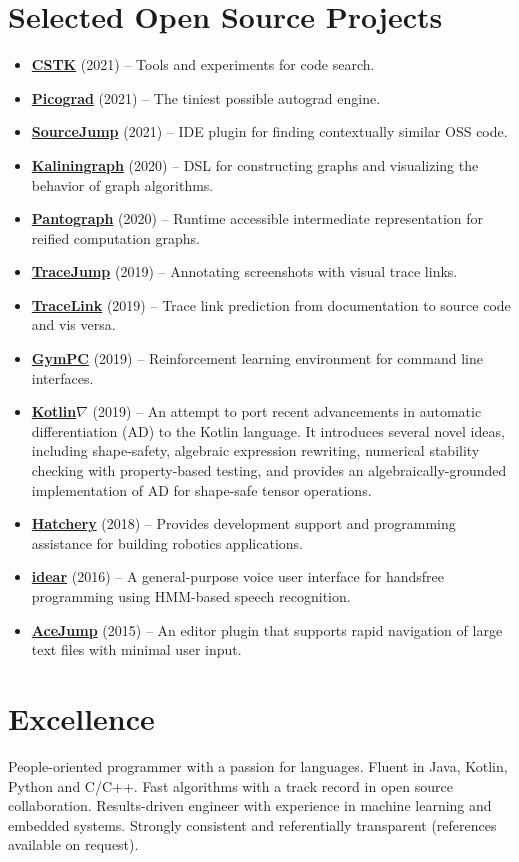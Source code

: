 \documentclass[letterpaper,11pt]{article}
\newcommand{\resumeItem}[2]{
  \item\small{\textbf{#1}{ #2 }}
}
\newcommand{\resumeSubItem}[2]{\resumeItem{#1}{#2}}
\newcommand{\resumeSubHeadingListStart}{\begin{itemize}[leftmargin=*]}
\newcommand{\resumeSubHeadingListEnd}{\end{itemize}}
\begin{document}
\begin{justify}
\section{Selected Open Source Projects}
\resumeSubHeadingListStart
\resumeSubItem{\href{https://github.com/breandan/CSTK}{CSTK}}{(2021) -- Tools and experiments for code search.}
\resumeSubItem{\href{https://github.com/breandan/picograd}{Picograd}}{(2021) -- The tiniest possible autograd engine.}
\resumeSubItem{\href{https://github.com/acejump/sourcejump}{SourceJump}}{(2021) -- IDE plugin for finding contextually similar OSS code.}
\resumeSubItem{\href{https://github.com/breandan/kaliningraph}{Kaliningraph}}{(2020) -- DSL for constructing graphs and visualizing the behavior of graph algorithms.}
\resumeSubItem{\href{https://github.com/breandan/pantograph}{Pantograph}}{(2020) -- Runtime accessible intermediate representation for reified computation graphs.}
\resumeSubItem{\href{https://github.com/acejump/tracejump}{TraceJump}}{(2019) -- Annotating screenshots with visual trace links.}
\resumeSubItem{\href{https://github.com/breandan/tracelink}{TraceLink}}{(2019) -- Trace link prediction from documentation to source code and vis versa.}
\resumeSubItem{\href{https://github.com/breandan/gym-pc}{GymPC}}{(2019) -- Reinforcement learning environment for command line interfaces.}
\resumeSubItem{\href{https://github.com/breandan/kotlingrad}{Kotlin$\nabla$}}{(2019) -- An attempt to port recent advancements in automatic differentiation (AD) to the Kotlin language. It introduces several novel ideas, including shape-safety, algebraic expression rewriting, numerical stability checking with property-based testing, and provides an algebraically-grounded implementation of AD for shape-safe tensor operations.}
\resumeSubItem{\href{https://github.com/duckietown/hatchery}{Hatchery}}{(2018) -- Provides development support and programming assistance for building robotics applications.}
\resumeSubItem{\href{https://github.com/OpenASR/idear}{idear}}{(2016) -- A general-purpose voice user interface for handsfree programming using HMM-based speech recognition.}
\resumeSubItem{\href{https://github.com/acejump/AceJump}{AceJump}}{(2015) -- An editor plugin that supports rapid navigation of large text files with minimal user input.}
\resumeSubHeadingListEnd

\section{Excellence}
People-oriented programmer with a passion for languages. Fluent in Java, Kotlin, Python and C/C++. Fast algorithms with a track record in open source collaboration. Results-driven engineer with experience in machine learning and embedded systems. Strongly consistent and referentially transparent (references available on request).
\end{justify}
\end{document}
